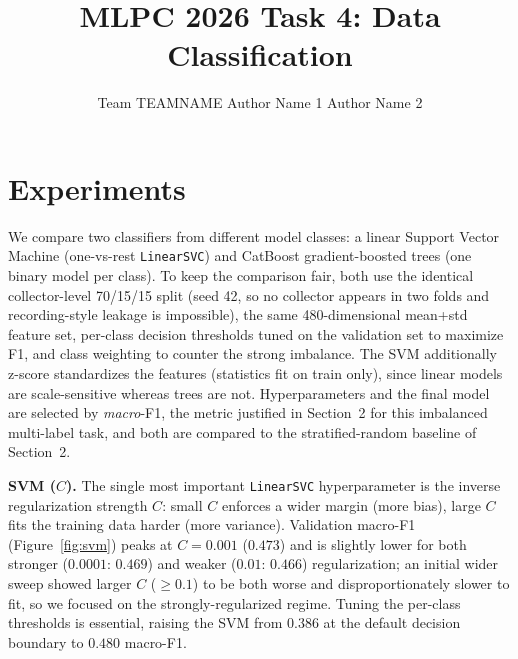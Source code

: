 \documentclass{article}
\title{MLPC 2026 Task 4: Data Classification}
\author{%
  Team TEAMNAME \AND
  Author Name 1
  \And
  Author Name 2
}
\begin{document}
\maketitle



\section{Experiments}

We compare two classifiers from different model classes: a linear Support Vector
Machine (one-vs-rest \texttt{LinearSVC}) and CatBoost gradient-boosted trees (one
binary model per class). To keep the comparison fair, both use the identical
collector-level 70/15/15 split (seed 42, so no collector appears in two folds and
recording-style leakage is impossible), the same 480-dimensional mean+std feature
set, per-class decision thresholds tuned on the validation set to maximize F1,
and class weighting to counter the strong imbalance. The SVM additionally z-score
standardizes the features (statistics fit on train only), since linear models are
scale-sensitive whereas trees are not. Hyperparameters and the final model are
selected by \emph{macro}-F1, the metric justified in Section~2 for this
imbalanced multi-label task, and both are compared to the stratified-random
baseline of Section~2.

\textbf{SVM ($C$).} The single most important \texttt{LinearSVC} hyperparameter
is the inverse regularization strength $C$: small $C$ enforces a wider margin
(more bias), large $C$ fits the training data harder (more variance). Validation
macro-F1 (Figure~\ref{fig:svm}) peaks at $C=0.001$ ($0.473$) and is slightly
lower for both stronger ($0.0001$: $0.469$) and weaker ($0.01$: $0.466$)
regularization; an initial wider sweep showed larger $C$ ($\geq0.1$) to be both
worse and disproportionately slower to fit, so we focused on the
strongly-regularized regime. Tuning the per-class thresholds is essential, raising
the SVM from $0.386$ at the default decision boundary to $0.480$ macro-F1.
\end{document}

